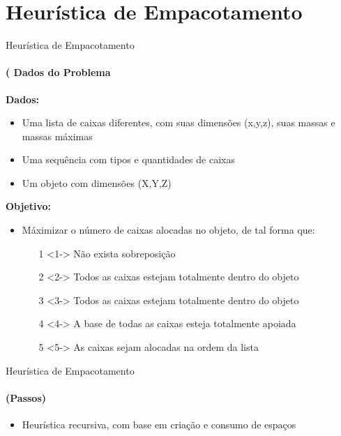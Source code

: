 \documentclass[12pt]{beamer}
\begin{document}
\section{Heur\'istica de Empacotamento} %
	\begin{frame}[shrink]{Heur\'istica de Empacotamento} %
		\footnotesize
	\framesubtitle{( Dados do Problema}
	{\bfseries Dados:}
    \begin{itemize}  	
    	\item Uma lista de caixas diferentes, com suas dimensões (x,y,z), suas massas e  massas m\'aximas
    	\item Uma sequ\^encia com tipos e quantidades de caixas
    	\item Um objeto com dimens\~oes (X,Y,Z)  	
    \end{itemize}
	{\bfseries Objetivo:}
	   \begin{itemize}		
		\item M\'aximizar o n\'umero de caixas alocadas no objeto, de tal forma que:

			\begin{itemize}			
			\item[1]<1->  N\~ao exista sobreposi\c{c}\~ao
			\item[2]<2-> Todos as caixas estejam totalmente dentro do objeto	
			\item[3]<3-> Todos as caixas estejam totalmente dentro do objeto
			\item[4]<4-> A base de todas as caixas esteja totalmente apoiada
			\item[5]<5-> As caixas sejam alocadas na ordem da lista
			\end{itemize} 	
	\end{itemize}
\end{frame}

\begin{frame}{Heur\'istica de Empacotamento} %
	\framesubtitle{(Passos)}

	\begin{itemize}
		\item  Heur\'istica recursiva, com base em cria\c{c}\~ao e consumo de espa\c{c}os
	\end{itemize}
	
	\pause
	\begin{algorithm}[H]
		\SetAlgoLined
		\caption{Empacotamento}
	\end{algorithm}
\end{frame}
\end{document}

